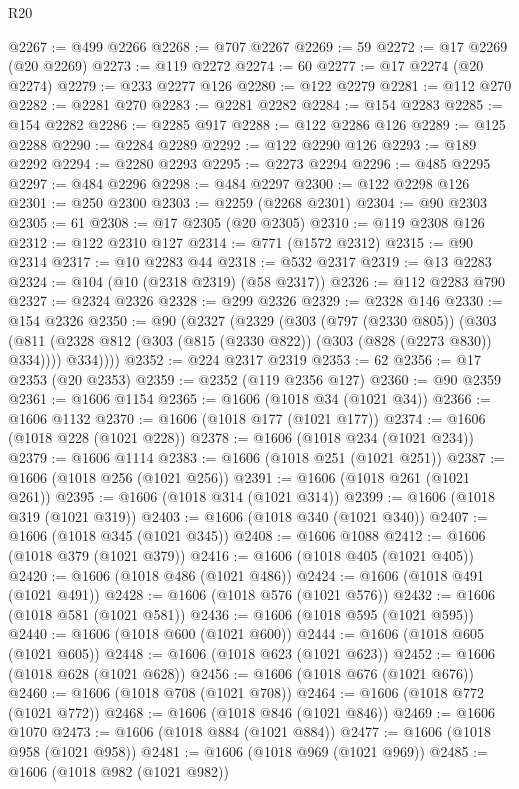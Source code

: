 \begin{lexlean}{R20}
\begin{coremodule}
@2267 := @499 @2266
@2268 := @707 @2267
@2269 := 59
@2272 := @17 @2269 (@20 @2269)
@2273 := @119 @2272
@2274 := 60
@2277 := @17 @2274 (@20 @2274)
@2279 := @233 @2277 @126
@2280 := @122 @2279
@2281 := @112 @270
@2282 := @2281 @270
@2283 := @2281 @2282
@2284 := @154 @2283
@2285 := @154 @2282
@2286 := @2285 @917
@2288 := @122 @2286 @126
@2289 := @125 @2288
@2290 := @2284 @2289
@2292 := @122 @2290 @126
@2293 := @189 @2292
@2294 := @2280 @2293
@2295 := @2273 @2294
@2296 := @485 @2295
@2297 := @484 @2296
@2298 := @484 @2297
@2300 := @122 @2298 @126
@2301 := @250 @2300
@2303 := @2259 (@2268 @2301)
@2304 := @90 @2303
@2305 := 61
@2308 := @17 @2305 (@20 @2305)
@2310 := @119 @2308 @126
@2312 := @122 @2310 @127
@2314 := @771 (@1572 @2312)
@2315 := @90 @2314
@2317 := @10 @2283 @44
@2318 := @532 @2317
@2319 := @13 @2283
@2324 := @104 (@10 (@2318 @2319) (@58 @2317))
@2326 := @112 @2283 @790
@2327 := @2324 @2326
@2328 := @299 @2326
@2329 := @2328 @146
@2330 := @154 @2326
@2350 := @90
    (@2327
      (@2329
        (@303
          (@797 (@2330 @805))
          (@303
            (@811 (@2328 @812 (@303 (@815 (@2330 @822)) (@303 (@828 (@2273 @830)) @334))))
            @334))))
@2352 := @224 @2317 @2319
@2353 := 62
@2356 := @17 @2353 (@20 @2353)
@2359 := @2352 (@119 @2356 @127)
@2360 := @90 @2359
@2361 := @1606 @1154
@2365 := @1606 (@1018 @34 (@1021 @34))
@2366 := @1606 @1132
@2370 := @1606 (@1018 @177 (@1021 @177))
@2374 := @1606 (@1018 @228 (@1021 @228))
@2378 := @1606 (@1018 @234 (@1021 @234))
@2379 := @1606 @1114
@2383 := @1606 (@1018 @251 (@1021 @251))
@2387 := @1606 (@1018 @256 (@1021 @256))
@2391 := @1606 (@1018 @261 (@1021 @261))
@2395 := @1606 (@1018 @314 (@1021 @314))
@2399 := @1606 (@1018 @319 (@1021 @319))
@2403 := @1606 (@1018 @340 (@1021 @340))
@2407 := @1606 (@1018 @345 (@1021 @345))
@2408 := @1606 @1088
@2412 := @1606 (@1018 @379 (@1021 @379))
@2416 := @1606 (@1018 @405 (@1021 @405))
@2420 := @1606 (@1018 @486 (@1021 @486))
@2424 := @1606 (@1018 @491 (@1021 @491))
@2428 := @1606 (@1018 @576 (@1021 @576))
@2432 := @1606 (@1018 @581 (@1021 @581))
@2436 := @1606 (@1018 @595 (@1021 @595))
@2440 := @1606 (@1018 @600 (@1021 @600))
@2444 := @1606 (@1018 @605 (@1021 @605))
@2448 := @1606 (@1018 @623 (@1021 @623))
@2452 := @1606 (@1018 @628 (@1021 @628))
@2456 := @1606 (@1018 @676 (@1021 @676))
@2460 := @1606 (@1018 @708 (@1021 @708))
@2464 := @1606 (@1018 @772 (@1021 @772))
@2468 := @1606 (@1018 @846 (@1021 @846))
@2469 := @1606 @1070
@2473 := @1606 (@1018 @884 (@1021 @884))
@2477 := @1606 (@1018 @958 (@1021 @958))
@2481 := @1606 (@1018 @969 (@1021 @969))
@2485 := @1606 (@1018 @982 (@1021 @982))

\end{coremodule}
\end{lexlean}
